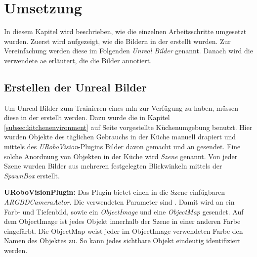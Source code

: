 \graphicspath{{./images/}}      
\def\CHAPTERONE{./chapters/Chapter-1} 

\chapter{Umsetzung}
\label{chap:implementation}
%	

In diesem Kapitel wird beschrieben, wie die einzelnen Arbeitsschritte umgesetzt wurden. Zuerst wird aufgezeigt, wie die Bildern in der \unreal erstellt wurden. Zur Vereinfachung werden diese  im Folgenden \textit{Unreal Bilder} genannt. Danach wird die verwendete \gls{ae} erläutert, die die Bilder annotiert. 

\section{Erstellen der Unreal Bilder}
\label{sec:takingpics}
Um Unreal Bilder zum Trainieren eines \gls{mln} zur Verfügung zu haben, müssen diese in der \unreal erstellt werden. Dazu wurde die in Kapitel \ref{subsec:kitchenenvironment} auf Seite \pageref{subsec:kitchenenvironment} vorgestellte Küchenumgebung benutzt. Hier wurden Objekte des täglichen Gebrauchs in der Küche manuell drapiert und mittels des \textit{URoboVision}-Plugins Bilder davon gemacht und an \robosherlock gesendet. Eine solche Anordnung von Objekten in der Küche wird \textit{Szene} genannt. Von jeder Szene wurden Bilder aus mehreren festgelegten Blickwinkeln mittels der \textit{SpawnBox} erstellt. \par 

\textbf{URoboVisionPlugin:} Das Plugin bietet einen in die Szene einfügbaren \textit{ARGBDCameraActor}. Die verwendeten Parameter sind . Damit wird an \robosherlock ein Farb- und Tiefenbild, sowie ein \textit{ObjectImage} und eine \textit{ObjectMap} gesendet. Auf dem ObjectImage ist jedes Objekt innerhalb der Szene in einer anderen Farbe eingefärbt. Die ObjectMap weist jeder im ObjectImage verwendeten Farbe den Namen des Objektes zu. So kann jedes sichtbare Objekt eindeutig identifiziert werden.   \par 

